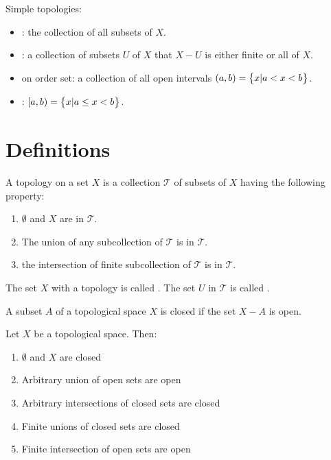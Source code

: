 \begin{example}
    Simple topologies:
\begin{itemize}
    \item {}: the collection of all subsets of $X$.
    \item {}: a collection of subsets $U$ of $X$ that $X - U$ is either finite or all of $X$.
    \item {} on order set: a collection of all open intervals $(a,b) = \set{x | a < x < b}$.
    \item {} : $[a,b) = \set{x | a \leq x < b}$.
\end{itemize}
\end{example}




\section{Definitions}

\begin{definition}
    A topology on a set $X$ is a collection $\mathcal{T}$ of subsets of $X$ having the following property:
    \begin{enumerate}
        \item $\emptyset$ and $X$ are in $\mathcal{T}$.
        \item The union of any subcollection of $\mathcal{T}$ is in $\mathcal{T}$.
        \item the intersection of finite subcollection of $\mathcal{T}$ is in $\mathcal{T}$.
    \end{enumerate}

The set $X$ with a topology is called . The set $U$ in $\mathcal{T}$ is called .
\end{definition}

\begin{definition}
    A subset $A$ of a topological space $X$ is closed if the set $X - A$ is open.
\end{definition}

\begin{definition}
    Let $X$ be a topological space. Then:
    \begin{enumerate}
        \item $\emptyset$ and $X$ are closed
        \item Arbitrary union of open sets are open
        \item Arbitrary intersections of closed sets are closed
        \item Finite unions of closed sets are closed
        \item Finite intersection of open sets are open
    \end{enumerate}
\end{definition}



